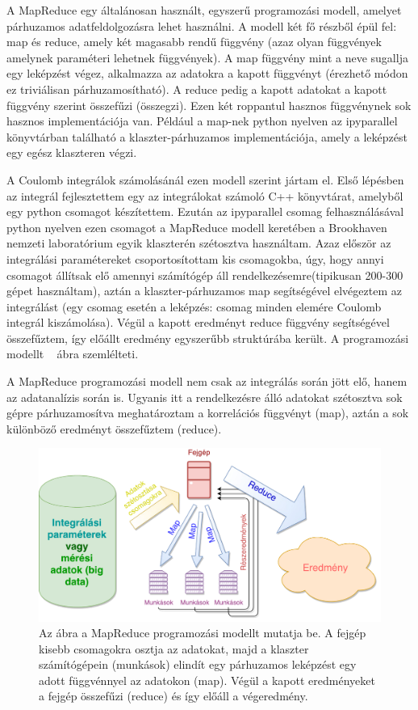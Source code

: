 \documentclass[11pt,a4paper]{article}
\numberwithin{equation}{subsection}
\numberwithin{figure}{section}
\begin{document}
A MapReduce egy általánosan használt, egyszerű programozási modell, amelyet párhuzamos adatfeldolgozásra lehet használni. A modell két fő részből épül fel: map és reduce, amely két magasabb rendű függvény (azaz olyan függvények amelynek paraméteri lehetnek függvények). A map függvény mint a neve sugallja egy leképzést végez, alkalmazza az adatokra a kapott függvényt (érezhető módon ez triviálisan párhuzamosítható). A reduce pedig a kapott adatokat a kapott függvény szerint összefűzi (összegzi). Ezen két roppantul hasznos függvénynek sok hasznos implementációja van. Például a map-nek python nyelven az ipyparallel könyvtárban található a klaszter-párhuzamos implementációja, amely a leképzést egy egész klaszteren végzi. 

A Coulomb integrálok számolásánál ezen modell szerint jártam el. Első lépésben az integrál fejlesztettem egy az integrálokat számoló C++ könyvtárat, amelyből egy python csomagot készítettem. Ezután az ipyparallel csomag felhasználásával python nyelven ezen csomagot a MapReduce modell keretében a Brookhaven nemzeti laboratórium egyik klaszterén szétosztva használtam. Azaz először az integrálási paramétereket csoportosítottam kis csomagokba, úgy, hogy annyi csomagot állítsak elő amennyi számítógép áll rendelkezésemre(tipikusan 200-300 gépet használtam), aztán a klaszter-párhuzamos map segítségével elvégeztem az integrálást (egy csomag esetén a leképzés: csomag minden elemére Coulomb integrál kiszámolása). Végül a kapott eredményt reduce függvény segítségével összefűztem, így előállt eredmény egyszerűbb struktúrába került. A programozási modellt ~ ábra szemlélteti.

A MapReduce programozási modell nem csak az integrálás során jött elő, hanem az adatanalízis során is. Ugyanis itt a rendelkezésre álló adatokat szétosztva sok gépre párhuzamosítva meghatároztam a korrelációs függvényt (map), aztán a sok különböző eredményt összefűztem (reduce).

\begin{figure}[H]
\centering
\includegraphics[scale=0.4]{pic/prog/MapReduce}
\caption{Az ábra a MapReduce programozási modellt mutatja be. A fejgép kisebb csomagokra osztja az adatokat, majd a klaszter számítógépein (munkások) elindít egy párhuzamos leképzést egy adott függvénnyel az adatokon (map). Végül a kapott eredményeket a fejgép összefűzi (reduce) és így előáll a végeredmény. }
\label{fig:mapreduce}
\end{figure}
\end{document}

